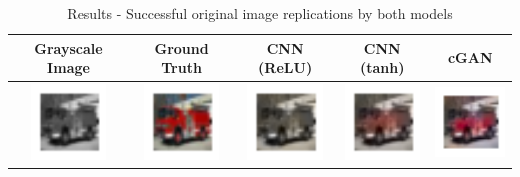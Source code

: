 \documentclass{article}
\begin{document}
\begin{table}[h!]
  \caption{Results - Successful original image replications by both models}
  \label{tab:1}
  \centering
  \begin{tabular}{ccccc}
    \toprule
    Grayscale Image & Ground Truth & CNN (ReLU) & CNN (tanh) & cGAN \\
    \midrule
    \includegraphics[width=2cm]{results3/23-bw.png} & \includegraphics[width=2cm]{results3/23-gt.png} & \includegraphics[width=2cm]{results5/23-relucnn.png} & \includegraphics[width=2cm]{results5/23-tanhcnn.png} & \includegraphics[width=2cm]{results3/23-gan.png} \\

\end{tabular}
\end{table}
\end{document}
